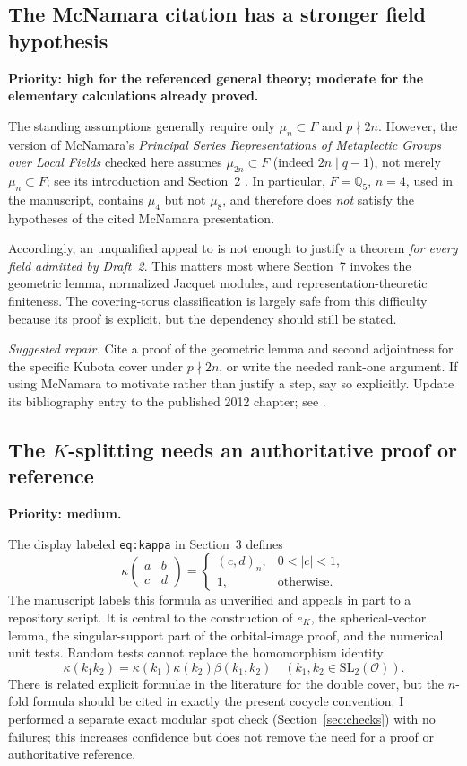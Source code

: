 \documentclass[12pt,letterpaper]{article}
\newcommand{\SL}{\mathrm{SL}}
\begin{document}
\subsection{The McNamara citation has a stronger field hypothesis}
\label{item:mc}
\textbf{Priority: high for the referenced general theory; moderate for the elementary calculations already proved.}

The standing assumptions generally require only $\mu_n\subset F$ and $p\nmid2n$. However, the version of McNamara's \emph{Principal Series Representations of Metaplectic Groups over Local Fields} checked here assumes $\mu_{2n}\subset F$ (indeed $2n\mid q-1$), not merely $\mu_n\subset F$; see its introduction and Section~2 \cite{Mc12}. In particular, $F=\mathbb Q_5$, $n=4$, used in the manuscript, contains $\mu_4$ but not $\mu_8$, and therefore does \emph{not} satisfy the hypotheses of the cited McNamara presentation.

Accordingly, an unqualified appeal to \cite{Mc12} is not enough to justify a theorem \emph{for every field admitted by Draft~2}. This matters most where Section~7 invokes the geometric lemma, normalized Jacquet modules, and representation-theoretic finiteness. The covering-torus classification is largely safe from this difficulty because its proof is explicit, but the dependency should still be stated.

\emph{Suggested repair.} Cite a proof of the geometric lemma and second adjointness for the specific Kubota cover under $p\nmid2n$, or write the needed rank-one argument. If using McNamara to motivate rather than justify a step, say so explicitly. Update its bibliography entry to the published 2012 chapter; see \cite{Mc12}.

\subsection{The \texorpdfstring{$K$}{K}-splitting needs an authoritative proof or reference}
\textbf{Priority: medium.}

The display labeled \texttt{eq:kappa} in Section~3 defines
\[
\kappa\!\begin{pmatrix}a&b\\c&d\end{pmatrix}
 =\begin{cases}(c,d)_n,&0<|c|<1,\\1,&\text{otherwise.}\end{cases}
\]
The manuscript labels this formula as unverified and appeals in part to a repository script.  It is central to the construction of $e_K$, the spherical-vector lemma, the singular-support part of the orbital-image proof, and the numerical unit tests.  Random tests cannot replace the homomorphism identity
\[
\kappa(k_1k_2)=\kappa(k_1)\kappa(k_2)\beta(k_1,k_2)
\quad (k_1,k_2\in\SL_2(\mathcal O)).
\]
There is related explicit formulae in the literature for the double cover, but the $n$-fold formula should be cited in exactly the present cocycle convention. I performed a separate exact modular spot check (Section~\ref{sec:checks}) with no failures; this increases confidence but does not remove the need for a proof or authoritative reference.
\end{document}
